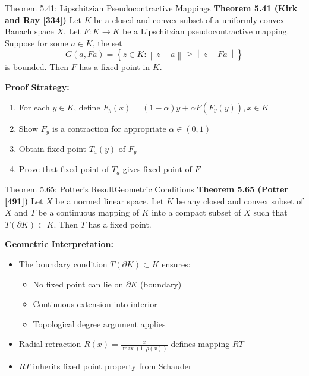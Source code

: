 \documentclass[aspectratio=169,10pt]{beamer}
\newcommand{\norm}[1]{\left\lVert#1\right\rVert}
\newcommand{\set}[1]{\left\{#1\right\}}
\begin{document}
\begin{frame}{Theorem 5.41: Lipschitzian Pseudocontractive Mappings}
    \textbf{Theorem 5.41 (Kirk and Ray [334])} Let $K$ be a closed and convex subset of a uniformly convex Banach space $X$. Let $F: K \to K$ be a Lipschitzian pseudocontractive mapping. Suppose for some $a \in K$, the set
    \[
        G(a, Fa) = \set{z \in K : \norm{z - a} \geq \norm{z - Fa}}
    \]
    is bounded. Then $F$ has a fixed point in $K$.

    \vspace{0.3cm}
    \textbf{Proof Strategy:}
    \begin{enumerate}
        \item For each $y \in K$, define $F_y(x) = (1-\alpha)y + \alpha F(F_y(y)), x \in K$
        \item Show $F_y$ is a contraction for appropriate $\alpha \in (0, 1)$
        \item Obtain fixed point $T_a(y)$ of $F_y$
        \item Prove that fixed point of $T_a$ gives fixed point of $F$
    \end{enumerate}
\end{frame}

\begin{frame}{Theorem 5.65: Potter's Result}{Geometric Conditions}
    \textbf{Theorem 5.65 (Potter [491])} Let $X$ be a normed linear space. Let $K$ be any closed and convex subset of $X$ and $T$ be a continuous mapping of $K$ into a compact subset of $X$ such that $T(\partial K) \subset K$. Then $T$ has a fixed point.

    \vspace{0.4cm}
    \textbf{Geometric Interpretation:}
    \begin{itemize}
        \item The boundary condition $T(\partial K) \subset K$ ensures:
        \begin{itemize}
            \item No fixed point can lie on $\partial K$ (boundary)
            \item Continuous extension into interior
            \item Topological degree argument applies
        \end{itemize}
        \item Radial retraction $R(x) = \frac{x}{\max(1, \rho(x))}$ defines mapping $RT$
        \item $RT$ inherits fixed point property from Schauder
    \end{itemize}
\end{frame}
\end{document}
